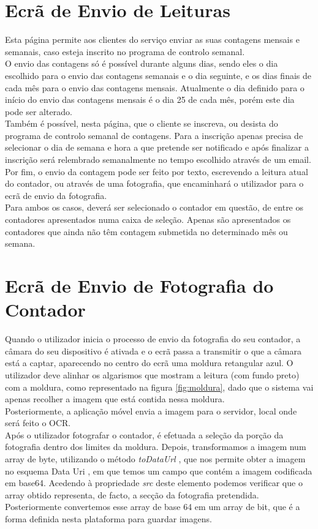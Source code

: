 \section{Ecrã de Envio de Leituras} \label{ecra:leituras}  %
Esta página permite aos clientes do serviço enviar as suas contagens mensais e semanais, caso esteja inscrito no programa de controlo semanal.\\
O envio das contagens só é possível durante alguns dias, sendo eles o dia escolhido para o envio das contagens semanais e o dia seguinte, e os dias finais de cada mês para o envio das contagens mensais. Atualmente o dia definido para o início do envio das contagens mensais é o dia 25 de cada mês, porém este dia pode ser alterado.\\
Também é possível, nesta página, que o cliente se inscreva, ou desista do programa de controlo semanal de contagens. Para a inscrição apenas precisa de selecionar o dia de semana e hora a que pretende ser notificado e após finalizar a inscrição será relembrado semanalmente no tempo escolhido através de um email.\\
Por fim, o envio da contagem pode ser feito por texto, escrevendo a leitura atual do contador, ou através de uma fotografia, que encaminhará o utilizador para o ecrã de envio da fotografia.\\
Para ambos os casos, deverá ser selecionado o contador em questão, de entre os contadores apresentados numa caixa de seleção. Apenas são apresentados os contadores que ainda não têm contagem submetida no determinado mês ou semana.

\section{Ecrã de Envio de Fotografia do Contador} \label{ecra:foto}  %
Quando o utilizador inicia o processo de envio da fotografia do seu contador, a câmara do seu dispositivo é ativada e o ecrã passa a transmitir o que a câmara está a captar, aparecendo no centro do ecrã uma moldura retangular azul. O utilizador deve alinhar os algarismos que mostram a leitura (com fundo preto) com a moldura, como representado na figura \ref{fig:moldura}, dado que o sistema vai apenas recolher a imagem que está contida nessa moldura.\\
Posteriormente, a aplicação móvel envia a imagem para o servidor, local onde será feito o OCR.\\
Após o utilizador fotografar o contador, é efetuada a seleção da porção da fotografia dentro dos limites da moldura. Depois, transformamos a imagem num array de byte, utilizando o método \textit{toDataUrl} , que nos permite obter a imagem no esquema Data Uri \cite{dataurl}, em que temos um campo que contém a imagem codificada em base64. Acedendo à propriedade \textit{src} deste elemento podemos verificar que o array obtido representa, de facto, a secção da fotografia pretendida.\\
Posteriormente convertemos esse array de base 64 em um array de bit, que é a forma definida nesta plataforma para guardar imagens.

